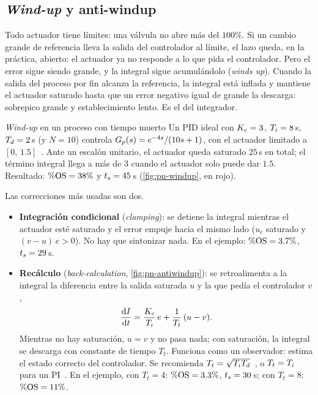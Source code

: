 
\subsection{\emph{Wind-up} y anti-windup}

Todo actuador tiene límites: una válvula no abre más del $100\%$. Si un cambio grande de referencia lleva la salida del controlador al límite, el lazo queda, en la práctica, abierto: el actuador ya no responde a lo que pida el controlador. Pero el error sigue siendo grande, y la integral sigue acumulándolo (\emph{winds up}). Cuando la salida del proceso por fin alcanza la referencia, la integral está inflada y mantiene el actuador saturado hasta que un error negativo igual de grande la descarga: sobrepico grande y establecimiento lento. Es el  del integrador.

\begin{ejemplo}[label=ej:pn-windup]{\emph{Wind-up} en un proceso con tiempo muerto}
Un PID ideal con $K_c=3$, $T_i=8$\,s, $T_d=2$\,s (y $N=10$) controla $G_p(s)=e^{-4s}/(10s+1)$, con el actuador limitado a $[0,\,1.5]$~\citep{Vis06}.
\solucion Ante un escalón unitario, el actuador queda saturado $25$\,s en total; el término integral llega a más de $3$ cuando el actuador solo puede dar $1.5$. Resultado: $\%\mathrm{OS}=38\%$ y $t_s=45$\,s (\cref{fig:pn-windup}, en rojo).
\end{ejemplo}

Las correcciones  más usadas son dos.
\begin{itemize}
  \item \textbf{Integración condicional} (\emph{clamping}): se detiene la integral mientras el actuador esté saturado y el error empuje hacia el mismo lado ($u_c$ saturado y $(v-u)\,e>0$). No hay que sintonizar nada. En el ejemplo: $\%\mathrm{OS}=3.7\%$, $t_s=29$\,s.
  \item \textbf{Recálculo} (\emph{back-calculation}, \cref{fig:pn-antiwindup}): se retroalimenta a la integral la diferencia entre la salida saturada $u$ y la que pedía el controlador $v$,
  \[
    \frac{\mathrm{d} I}{\mathrm{d} t}=\frac{K_c}{T_i}\,e+\frac{1}{T_t}\,(u-v).
  \]
  Mientras no hay saturación, $u=v$ y no pasa nada; con saturación, la integral se descarga con constante de tiempo $T_t$. Funciona como un observador: estima el estado correcto del controlador. Se recomienda $T_t=\sqrt{T_iT_d}$~\citep{astrom1995pid}, o $T_t=T_i$ para un PI~\citep{atherton1995pid}. En el ejemplo, con $T_t=4$: $\%\mathrm{OS}=3.3\%$, $t_s=30$\,s; con $T_t=8$: $\%\mathrm{OS}=11\%$.
\end{itemize}

